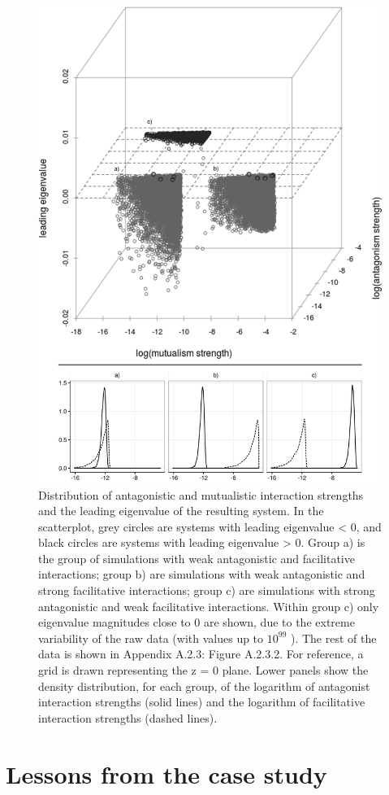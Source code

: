 \begin{figure}[!ht]
\centering
\includegraphics[width=.75\textwidth]{./Figures/chapter02/Fig_3.png}
\caption[Equal footing network analysis]{\color{Gray} Distribution of antagonistic and mutualistic interaction strengths and the leading eigenvalue of the resulting system. In the scatterplot, grey circles are systems with leading eigenvalue < 0, and black circles are systems with leading eigenvalue > 0. Group a) is the group of simulations with weak antagonistic and facilitative interactions; group b) are simulations with weak antagonistic and strong facilitative interactions; group c) are simulations with strong antagonistic and weak facilitative interactions. Within group c) only eigenvalue magnitudes close to 0 are shown, due to the extreme variability of the raw data (with values up to $10^99$ ). The rest of the data is shown in Appendix A.2.3: Figure A.2.3.2. For reference, a grid is drawn representing the z = 0 plane. Lower panels show the density distribution, for each group, of the logarithm of antagonist interaction strengths (solid lines) and the logarithm of facilitative interaction strengths (dashed lines).}
\label{fig:fig2.3}
\end{figure}


\section{Lessons from the case study}

